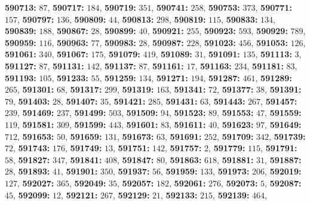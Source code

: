 \textsf{\bfseries 590713:} $87$, \textsf{\bfseries 590717:} $184$, \textsf{\bfseries 590719:} $351$, \textsf{\bfseries 590741:} $258$, \textsf{\bfseries 590753:} $373$, \textsf{\bfseries 590771:} $157$, \textsf{\bfseries 590797:} $136$, \textsf{\bfseries 590809:} $44$, \textsf{\bfseries 590813:} $298$, \textsf{\bfseries 590819:} $115$, \textsf{\bfseries 590833:} $134$, \textsf{\bfseries 590839:} $188$, \textsf{\bfseries 590867:} $28$, \textsf{\bfseries 590899:} $40$, \textsf{\bfseries 590921:} $255$, \textsf{\bfseries 590923:} $593$, \textsf{\bfseries 590929:} $789$, \textsf{\bfseries 590959:} $116$, \textsf{\bfseries 590963:} $77$, \textsf{\bfseries 590983:} $28$, \textsf{\bfseries 590987:} $228$, \textsf{\bfseries 591023:} $456$, \textsf{\bfseries 591053:} $126$, \textsf{\bfseries 591061:} $340$, \textsf{\bfseries 591067:} $175$, \textsf{\bfseries 591079:} $419$, \textsf{\bfseries 591089:} $31$, \textsf{\bfseries 591091:} $135$, \textsf{\bfseries 591113:} $3$, \textsf{\bfseries 591127:} $87$, \textsf{\bfseries 591131:} $142$, \textsf{\bfseries 591137:} $87$, \textsf{\bfseries 591161:} $17$, \textsf{\bfseries 591163:} $234$, \textsf{\bfseries 591181:} $83$, \textsf{\bfseries 591193:} $105$, \textsf{\bfseries 591233:} $55$, \textsf{\bfseries 591259:} $134$, \textsf{\bfseries 591271:} $194$, \textsf{\bfseries 591287:} $461$, \textsf{\bfseries 591289:} $265$, \textsf{\bfseries 591301:} $68$, \textsf{\bfseries 591317:} $299$, \textsf{\bfseries 591319:} $163$, \textsf{\bfseries 591341:} $72$, \textsf{\bfseries 591377:} $38$, \textsf{\bfseries 591391:} $79$, \textsf{\bfseries 591403:} $28$, \textsf{\bfseries 591407:} $35$, \textsf{\bfseries 591421:} $285$, \textsf{\bfseries 591431:} $63$, \textsf{\bfseries 591443:} $267$, \textsf{\bfseries 591457:} $239$, \textsf{\bfseries 591469:} $237$, \textsf{\bfseries 591499:} $503$, \textsf{\bfseries 591509:} $94$, \textsf{\bfseries 591523:} $89$, \textsf{\bfseries 591553:} $47$, \textsf{\bfseries 591559:} $119$, \textsf{\bfseries 591581:} $309$, \textsf{\bfseries 591599:} $443$, \textsf{\bfseries 591601:} $83$, \textsf{\bfseries 591611:} $40$, \textsf{\bfseries 591623:} $97$, \textsf{\bfseries 591649:} $712$, \textsf{\bfseries 591653:} $50$, \textsf{\bfseries 591659:} $131$, \textsf{\bfseries 591673:} $63$, \textsf{\bfseries 591691:} $252$, \textsf{\bfseries 591709:} $342$, \textsf{\bfseries 591739:} $72$, \textsf{\bfseries 591743:} $176$, \textsf{\bfseries 591749:} $13$, \textsf{\bfseries 591751:} $142$, \textsf{\bfseries 591757:} $2$, \textsf{\bfseries 591779:} $115$, \textsf{\bfseries 591791:} $58$, \textsf{\bfseries 591827:} $347$, \textsf{\bfseries 591841:} $408$, \textsf{\bfseries 591847:} $80$, \textsf{\bfseries 591863:} $618$, \textsf{\bfseries 591881:} $31$, \textsf{\bfseries 591887:} $28$, \textsf{\bfseries 591893:} $41$, \textsf{\bfseries 591901:} $350$, \textsf{\bfseries 591937:} $56$, \textsf{\bfseries 591959:} $133$, \textsf{\bfseries 591973:} $206$, \textsf{\bfseries 592019:} $127$, \textsf{\bfseries 592027:} $365$, \textsf{\bfseries 592049:} $35$, \textsf{\bfseries 592057:} $182$, \textsf{\bfseries 592061:} $276$, \textsf{\bfseries 592073:} $5$, \textsf{\bfseries 592087:} $45$, \textsf{\bfseries 592099:} $12$, \textsf{\bfseries 592121:} $267$, \textsf{\bfseries 592129:} $21$, \textsf{\bfseries 592133:} $215$, \textsf{\bfseries 592139:} $464$, 
